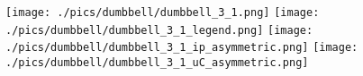 \documentclass{standalone}
\begin{document}
  \begin{minipage}[t]{\textwidth}

  \begin{figure}
      \centering
      \texttt{[image: ./pics/dumbbell/dumbbell\_3\_1.png]}
      \qquad
      \texttt{[image: ./pics/dumbbell/dumbbell\_3\_1\_legend.png]}
      \vfill
      \texttt{[image: ./pics/dumbbell/dumbbell\_3\_1\_ip\_asymmetric.png]}
      \qquad
      \texttt{[image: ./pics/dumbbell/dumbbell\_3\_1\_uC\_asymmetric.png]}
  \end{figure}

  \end{minipage}
\end{document}
